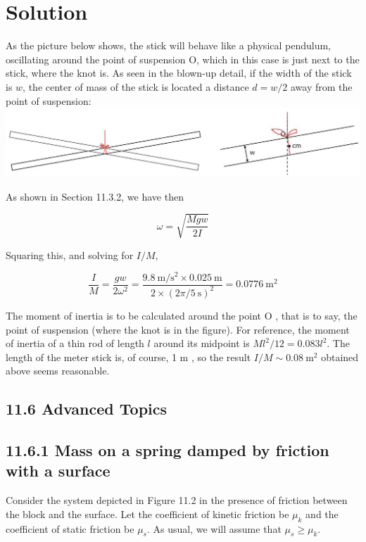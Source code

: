 \documentclass[10pt]{article}
\begin{document}
\section*{Solution}
As the picture below shows, the stick will behave like a physical pendulum, oscillating around the point of suspension O, which in this case is just next to the stick, where the knot is. As seen in the blown-up detail, if the width of the stick is $w$, the center of mass of the stick is located a distance $d=w / 2$ away from the point of suspension:\\
\includegraphics[max width=\textwidth, center]{2024_09_14_9969b06773f10b6936e8g-288(1)}

As shown in Section 11.3.2, we have then


\begin{equation*}
\omega=\sqrt{\frac{M g w}{2 I}} \tag{11.30}
\end{equation*}


Squaring this, and solving for $I / M$,


\begin{equation*}
\frac{I}{M}=\frac{g w}{2 \omega^{2}}=\frac{9.8 \mathrm{~m} / \mathrm{s}^{2} \times 0.025 \mathrm{~m}}{2 \times(2 \pi / 5 \mathrm{~s})^{2}}=0.0776 \mathrm{~m}^{2} \tag{11.31}
\end{equation*}


The moment of inertia is to be calculated around the point O , that is to say, the point of suspension (where the knot is in the figure). For reference, the moment of inertia of a thin rod of length $l$ around its midpoint is $M l^{2} / 12=0.083 l^{2}$. The length of the meter stick is, of course, 1 m , so the result $I / M \sim 0.08 \mathrm{~m}^{2}$ obtained above seems reasonable.

\subsection*{11.6 Advanced Topics}
\subsection*{11.6.1 Mass on a spring damped by friction with a surface}
Consider the system depicted in Figure 11.2 in the presence of friction between the block and the surface. Let the coefficient of kinetic friction be $\mu_{k}$ and the coefficient of static friction be $\mu_{s}$. As usual, we will assume that $\mu_{s} \geq \mu_{k}$.
\end{document}

